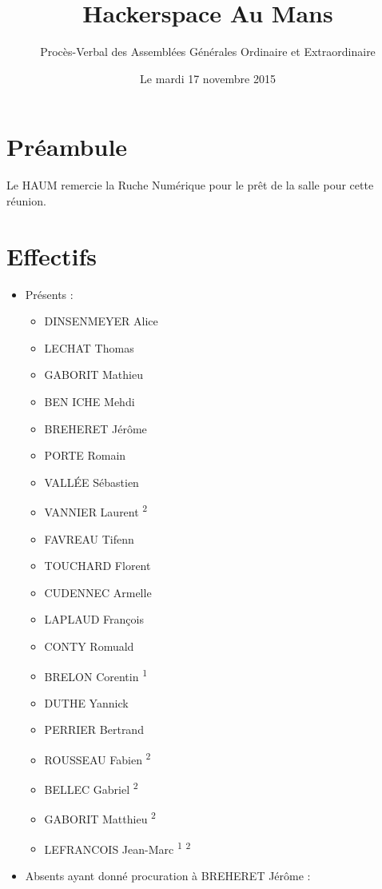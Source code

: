 \documentclass[a4paper, 11pt]{article}
\title{Hackerspace Au Mans}
\author{Procès-Verbal des Assemblées Générales Ordinaire et Extraordinaire}
\date{Le mardi 17 novembre 2015}
\begin{document}
\maketitle

\section*{Préambule}

Le HAUM remercie la Ruche Numérique pour le prêt de la salle pour cette réunion.

\section{Effectifs}

\begin{itemize}
	\item Présents : 
		\begin{itemize}
		  \item DINSENMEYER Alice
		  \item LECHAT Thomas
		  \item GABORIT Mathieu
		  \item BEN ICHE Mehdi
		  \item BREHERET Jérôme
		  \item PORTE Romain
		  \item VALLÉE Sébastien
		  \item VANNIER Laurent \textsuperscript{2}
		  \item FAVREAU Tifenn
		  \item TOUCHARD Florent
		  \item CUDENNEC Armelle
		  \item LAPLAUD François
		  \item CONTY Romuald
		  \item BRELON Corentin \textsuperscript{1} 
		  \item DUTHE Yannick
		  \item PERRIER Bertrand 
		  \item ROUSSEAU Fabien \textsuperscript{2}
		  \item BELLEC Gabriel \textsuperscript{2}
		  \item GABORIT Matthieu \textsuperscript{2}
		  \item LEFRANCOIS Jean-Marc \textsuperscript{1} \textsuperscript{2}
		\end{itemize}
	\item Absents ayant donné procuration à BREHERET Jérôme :
		\begin{itemize}

\end{itemize}
\end{itemize}
\end{document}
